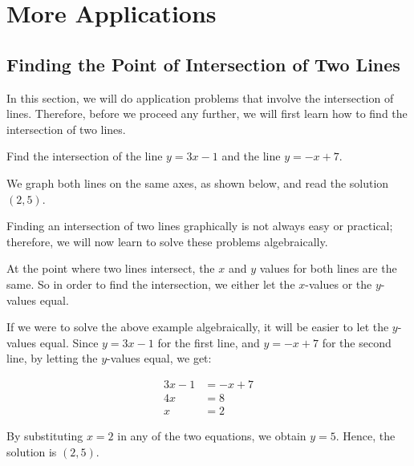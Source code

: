 \section{More Applications}
\subsection{Finding the Point of Intersection of Two Lines}

In this section, we will do application problems that involve the intersection of lines. Therefore, before we proceed any further, we will first learn how to find the intersection of two lines.

\begin{example}
Find the intersection of the line $y = 3x - 1$ and the line $y = -x + 7$.
\end{example}

\begin{solution}
We graph both lines on the same axes, as shown below, and read the solution $(2, 5)$.
\begin{center}
\end{center}

Finding an intersection of two lines graphically is not always easy or practical; therefore, we will now learn to solve these problems algebraically.

At the point where two lines intersect, the $x$ and $y$ values for both lines are the same. So in order to find the intersection, we either let the $x$-values or the $y$-values equal.

If we were to solve the above example algebraically, it will be easier to let the $y$-values equal. Since $y = 3x - 1$ for the first line, and $y = -x + 7$ for the second line, by letting the $y$-values equal, we get:

\begin{align*}
3x - 1 &= -x + 7 \\
4x &= 8 \\
x &= 2
\end{align*}

By substituting $x = 2$ in any of the two equations, we obtain $y = 5$. Hence, the solution is $(2, 5)$.
\end{solution}


